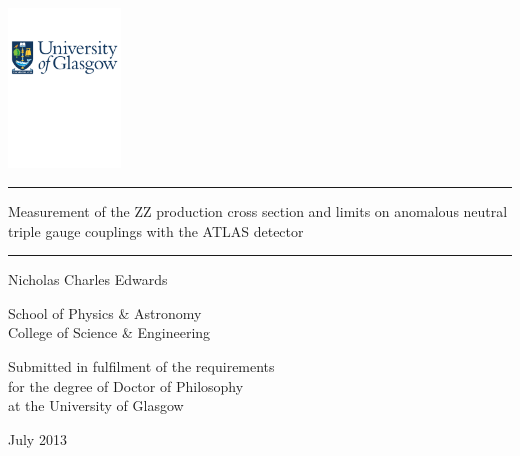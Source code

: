 \begin{titlepage}
\singlespacing
\begin{center}

\begin{minipage}{0.9\textwidth}

\centering

\includegraphics[width=3cm]{UniversityLogoNoText}

\vspace{0.5cm}

\rule{12.8cm}{1mm}\vspace{0.27cm}
\huge
Measurement of the ZZ production cross section and
limits on anomalous neutral triple gauge couplings with the ATLAS
detector\vspace{-2mm}
\rule{12.8cm}{1mm}

\end{minipage}

\begin{minipage}{0.7\textwidth}
\centering

\Large
\vspace{1.5cm}
Nicholas Charles Edwards 

\vspace{1.3cm}

\Large 
School of Physics \& Astronomy \\
College of Science \& Engineering 

\vspace{1.3cm}

\large 
Submitted in fulfilment of the requirements \\
for the degree of Doctor of Philosophy \\
at the University of Glasgow

\vspace{1.5cm}

July 2013

\end{minipage}

\end{center}
\end{titlepage}

